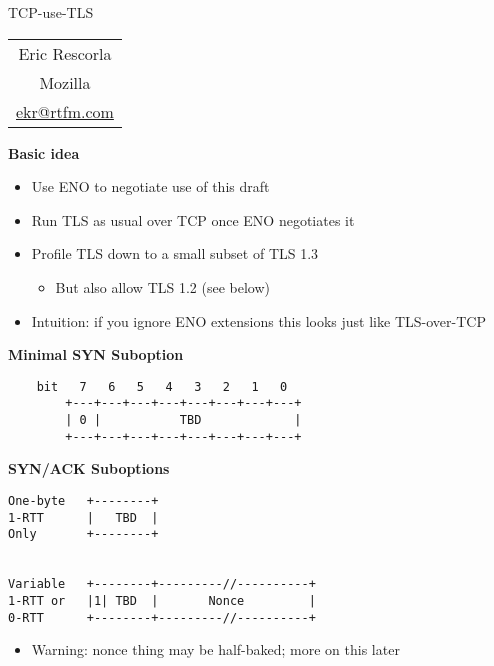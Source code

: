 \documentclass[helvetica]{seminar}
\newcommand{\heading}[1]{%
  \begin{center} 
    \large\bf 
    #1 
  \end{center} 
  \vspace{.4 in}}
\begin{document}
\begin{slide}
\begin{center}
\vspace{.5 in}
\LARGE{{\bf}TCP-use-TLS}\\
\vspace{.2in}
\large{
\begin{tabular}{c}
Eric Rescorla\\
Mozilla\\
\url{ekr@rtfm.com}
\end{tabular}
}
\end{center}

\end{slide}
\centerslidesfalse 

\begin{slide}
\heading{Basic idea}

\begin{itemize}
\item Use ENO to negotiate use of this draft
\item Run TLS as usual over TCP once ENO negotiates it
\item Profile TLS down to a small subset of TLS 1.3
  \begin{itemize}
  \item But also allow TLS 1.2 (see below)
  \end{itemize}
\item Intuition: if you ignore ENO extensions this looks just like TLS-over-TCP
\end{itemize}

\end{slide}


\begin{slide}
\heading{Minimal SYN Suboption}

\begin{verbatim}
    bit   7   6   5   4   3   2   1   0
        +---+---+---+---+---+---+---+---+
        | 0 |           TBD             |
        +---+---+---+---+---+---+---+---+
\end{verbatim}
\end{slide}

\begin{slide}
\heading{SYN/ACK Suboptions}

\begin{verbatim}
One-byte   +--------+
1-RTT      |   TBD  |
Only       +--------+  


Variable   +--------+---------//----------+
1-RTT or   |1| TBD  |       Nonce         |
0-RTT      +--------+---------//----------+
\end{verbatim}

\begin{itemize}
\item Warning: nonce thing may be half-baked; more on this later
\end{itemize}
\end{slide}
\end{document}
